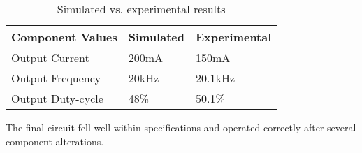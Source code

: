 \begin{table}[H]
	\centering
	\caption{Simulated vs. experimental results}
	\label{tab:simvsexp}
	\begin{tabular}{|l|l|l|}
		\hline
		Component Values  & Simulated & Experimental \\ \hline
		Output Current    & 200mA     & 150mA        \\ \hline
		Output Frequency  & 20kHz     & 20.1kHz      \\ \hline
		Output Duty-cycle & 48\%      & 50.1\%       \\ \hline
	\end{tabular}
\end{table}

The final circuit fell well within specifications and operated correctly after several component alterations.



